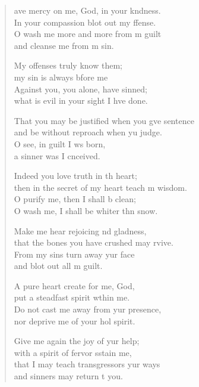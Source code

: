 \settowidth{\versewidth}{That you may be justified when you give sentence *}
\begin{verse}%
  \begin{patverse}
    ave mercy on me, God, in your k\pointup{\i}ndness.\Med\\
In your compassion blot out my ffense.\\
O wash me more and more from m guilt\Med\\
and cleanse me from m sin.

My offenses truly  know them;\Med\\
my sin is always bfore me\\
Against you, you alone, have  sinned;\Med\\
what is evil in your sight I hve done.

That you may be justified when you g\pointup{\i}ve sentence\Med\\
and be without reproach when yu judge.\\
O see, in guilt I ws born,\Med\\
a sinner was I cnceived.

Indeed you love truth in th heart;\Med\\
then in the secret of my heart teach m wisdom.\\
O purify me, then I shall b clean;\Med\\
O wash me, I shall be whiter thn snow.

Make me hear rejoicing nd gladness,\Med\\
that the bones you have crushed may rvive.\\
From my sins turn away yur face\Med\\
and blot out all m guilt.

A pure heart create for me,  God,\Med\\
put a steadfast spirit w\pointup{\i}thin me.\\
Do not cast me away from yur presence,\Med\\
nor deprive me of your hol spirit.

Give me again the joy of yur help;\Med\\
with a spirit of fervor sstain me,\\
that I may teach transgressors yur ways\Med\\
and sinners may return t you.


\end{patverse}
\end{verse}
